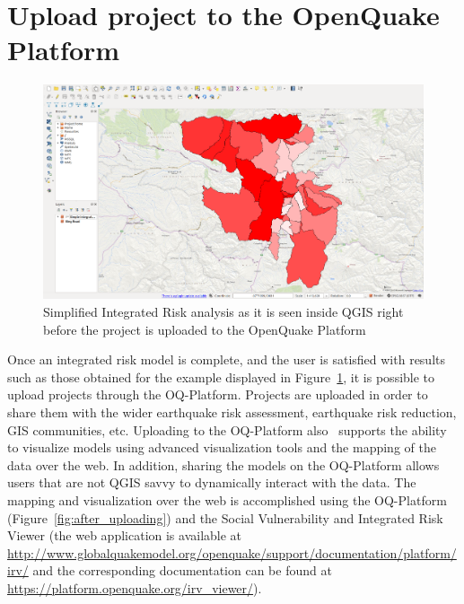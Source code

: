 \section{Upload project to the OpenQuake Platform}

\begin{figure}
    \centering
    \includegraphics[width=\textwidth]{../images/image22}
    \caption{Simplified Integrated Risk analysis as it is seen inside QGIS
    right before the project is uploaded to the OpenQuake Platform}
    \label{fig:before_uploading}
\end{figure}

Once an integrated risk model is complete, and the user is satisfied with
results such as those obtained for the example displayed in
Figure~\ref{fig:before_uploading}, it is possible to upload projects through
the OQ-Platform. Projects are uploaded in order to share them with the wider
earthquake risk assessment, earthquake risk reduction, GIS communities, etc.
Uploading to the OQ-Platform also  supports the ability to visualize models
using advanced visualization tools and the mapping of the data over the web. In
addition, sharing the models on the OQ-Platform allows users that are not QGIS
savvy to dynamically interact with the data. The mapping and visualization over
the web is accomplished using the OQ-Platform
(Figure~\ref{fig:after_uploading}) and the Social Vulnerability and Integrated
Risk Viewer (the web application is available at
\url{http://www.globalquakemodel.org/openquake/support/documentation/platform/irv/}
and the corresponding documentation can be found at
\url{https://platform.openquake.org/irv_viewer/}).

